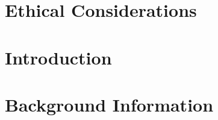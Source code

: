 \documentclass[12pt]{article}
\begin{document}
\pagebreak

\section*{Ethical Considerations}


\pagebreak

\tableofcontents

\pagebreak


\section{Introduction}


\section{Background Information}



\newpage


\end{document}
